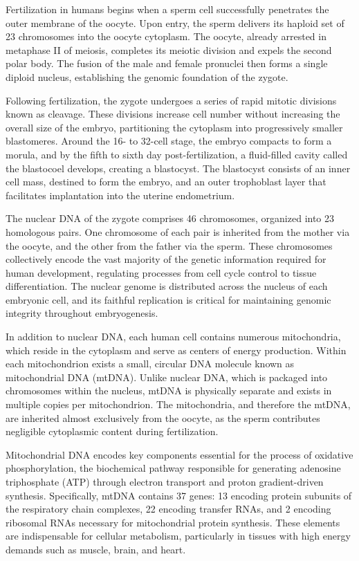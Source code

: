 Fertilization in humans begins when a sperm cell successfully penetrates the outer membrane of the oocyte. Upon entry, the sperm delivers its haploid set of 23 chromosomes into the oocyte cytoplasm. The oocyte, already arrested in metaphase II of meiosis, completes its meiotic division and expels the second polar body. The fusion of the male and female pronuclei then forms a single diploid nucleus, establishing the genomic foundation of the zygote.

Following fertilization, the zygote undergoes a series of rapid mitotic divisions known as cleavage. These divisions increase cell number without increasing the overall size of the embryo, partitioning the cytoplasm into progressively smaller blastomeres. Around the 16- to 32-cell stage, the embryo compacts to form a morula, and by the fifth to sixth day post-fertilization, a fluid-filled cavity called the blastocoel develops, creating a blastocyst. The blastocyst consists of an inner cell mass, destined to form the embryo, and an outer trophoblast layer that facilitates implantation into the uterine endometrium.

The nuclear DNA of the zygote comprises 46 chromosomes, organized into 23 homologous pairs. One chromosome of each pair is inherited from the mother via the oocyte, and the other from the father via the sperm. These chromosomes collectively encode the vast majority of the genetic information required for human development, regulating processes from cell cycle control to tissue differentiation. The nuclear genome is distributed across the nucleus of each embryonic cell, and its faithful replication is critical for maintaining genomic integrity throughout embryogenesis.

In addition to nuclear DNA, each human cell contains numerous mitochondria, which reside in the cytoplasm and serve as centers of energy production. Within each mitochondrion exists a small, circular DNA molecule known as mitochondrial DNA (mtDNA). Unlike nuclear DNA, which is packaged into chromosomes within the nucleus, mtDNA is physically separate and exists in multiple copies per mitochondrion. The mitochondria, and therefore the mtDNA, are inherited almost exclusively from the oocyte, as the sperm contributes negligible cytoplasmic content during fertilization.

Mitochondrial DNA encodes key components essential for the process of oxidative phosphorylation, the biochemical pathway responsible for generating adenosine triphosphate (ATP) through electron transport and proton gradient-driven synthesis. Specifically, mtDNA contains 37 genes: 13 encoding protein subunits of the respiratory chain complexes, 22 encoding transfer RNAs, and 2 encoding ribosomal RNAs necessary for mitochondrial protein synthesis. These elements are indispensable for cellular metabolism, particularly in tissues with high energy demands such as muscle, brain, and heart.

